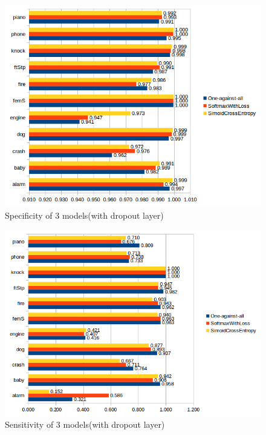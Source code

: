 \begin{figure}[h!]
	\caption{Specificity of 3 models(with dropout layer)}
	\label{fig:spec}
	\includegraphics[scale=0.85]{../image/chapter2/Specificity.png} 
\end{figure}


\begin{figure}[h!]
	\caption{Sensitivity of 3 models(with dropout layer)}
	\label{fig:sens}
	\includegraphics[scale=0.85]{../image/chapter2/Sensitivity.png} 
\end{figure}

